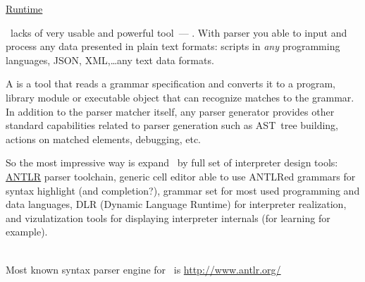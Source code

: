 
\href{https://www.youtube.com/watch?v=2AM85plUtDU}{Runtime}\bigskip

\noindent
\seco\ lacks of very usable and powerful tool\ --- . With
parser you able to input and process any data presented in plain text formats:
scripts in \emph{any} programming languages, JSON, XML,\ldots any text
data formats.

A  is a tool that reads a grammar specification and
converts it to a program, library module or executable object that can recognize
matches to the grammar. In addition to the parser matcher itself, any parser
generator provides other standard capabilities related to parser generation
such as AST\ tree building, actions on
matched elements, debugging, etc.

So the most impressive way is expand \seco\ by full set of interpreter design
tools: \href{http://www.antlr.org/}{ANTLR} parser toolchain, generic cell editor
able to use ANTLRed grammars for syntax highlight (and completion?), grammar set
for most used programming and data languages, DLR (Dynamic Language Runtime) for
interpreter realization, and vizulatization tools for displaying interpreter
internals (for learning for example).

\ \\

Most known syntax parser engine for \java\ is \url{http://www.antlr.org/}

